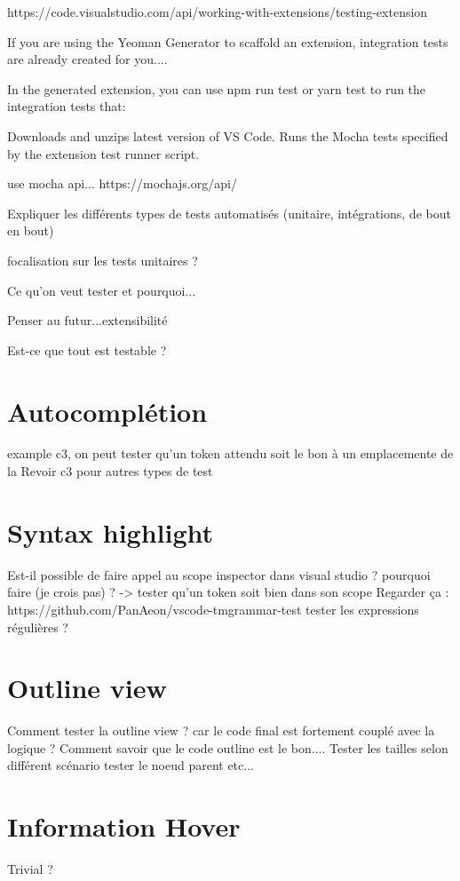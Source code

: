 \documentclass[
    iict, %
    il, %
]{heig-tb}
\begin{document}

https://code.visualstudio.com/api/working-with-extensions/testing-extension

If you are using the Yeoman Generator to scaffold an extension, integration tests are already created for you....

In the generated extension, you can use npm run test or yarn test to run the integration tests that:

Downloads and unzips latest version of VS Code.
Runs the Mocha tests specified by the extension test runner script.

use mocha api...
https://mochajs.org/api/


Expliquer les différents types de tests automatisés (unitaire, intégrations, de bout en bout)

focalisation sur les tests unitaires ?

Ce qu'on veut tester et pourquoi...

Penser au futur...extensibilité

Est-ce que tout est testable ?


\section{Autocomplétion}
example c3, on peut tester qu'un token attendu soit le bon à un emplacemente de la
Revoir c3 pour autres types de test

\section{Syntax highlight}
Est-il possible de faire appel au scope inspector dans visual studio ? pourquoi faire (je crois pas) ? -> tester qu'un token soit bien dans son scope
Regarder ça : https://github.com/PanAeon/vscode-tmgrammar-test
tester les expressions régulières ?


\section{Outline view}
Comment tester la outline view ? car le code final est fortement couplé avec la logique ?
Comment savoir que le code outline est le bon....
Tester les tailles selon différent scénario
tester le noeud parent etc...


\section{Information Hover}
Trivial ?
\end{document}
